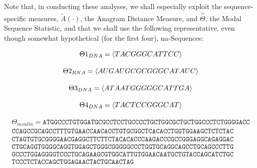 \documentclass[a4paper, 18pt]{book} %
\begin{document}
Note that, in conducting these analyses, we shall especially exploit the sequence-specific measures, $\tilde{A}(\cdot)$, the Anagram Distance Measure\cite{adtpaper}\cite{transformatics}, and $\overset{>}{\Theta}$, the Modal Sequence Statistic\cite{transformatics}, and that we shall use the following representative, even though somewhat hypothetical (for the first four), na-Sequences:

\begin{equation}
{\Theta1}_{DNA} = \langle TAC GGG CAT TCC \rangle\\
\end{equation}

\begin{equation}
{\Theta2}_{RNA} = \langle AUG AUG CGC GGG CAT AUC \rangle\\
\end{equation}

\begin{equation}
{\Theta3}_{DNA} = \langle ATA ATGG GGG CAT TGA \rangle\\
\end{equation}

\begin{equation}
{\Theta4}_{DNA} = \langle TAC TCC GGG CAT\rangle\\
\end{equation}

\begin{multline}
\Theta_{insulin} =  \texttt{ATGGCCCTGTGGATGCGCCTCCTGCCCCTGCTGGCGCTGCTGGCCCTCTGGGGACC}\\
\texttt{CCAGCCGCAGCCTTTGTGAACCAACACCTGTGCGGCTCACACCTGGTGGAAGCTCTCTAC}\\
\texttt{CTAGTGTGCGGGGAACGAGGCTTCTTCTACACACCCAAGACCCGCCGGGAGGCAGAGGAC}\\
\texttt{CTGCAGGTGGGGCAGGTGGAGCTGGGCGGGGGCCCTGGTGCAGGCAGCCTGCAGCCCTTG}\\
\texttt{GCCCTGGAGGGGTCCCTGCAGAAGCGTGGCATTGTGGAACAATGCTGTACCAGCATCTGC}\\
\texttt{TCCCTCTACCAGCTGGAGAACTACTGCAACTAG}
\end{multline}
\end{document}
